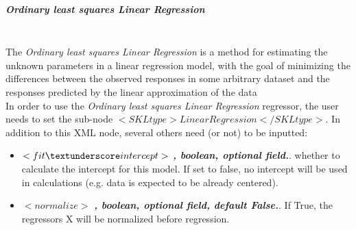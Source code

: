 \subparagraph{Ordinary least squares Linear Regression}
\mbox{}
\\The \textit{Ordinary least squares Linear Regression} is a method for estimating the unknown parameters in a linear regression model, with the goal of minimizing the differences between the observed responses in some arbitrary dataset and the responses predicted by the linear approximation of the data
\\In order to use the \textit{Ordinary least squares Linear Regression} regressor, the user needs to set the sub-node $<SKLtype>LinearRegression</SKLtype>$.
In addition to this XML node, several others need (or not) to be inputted:
\begin{itemize}
  \item $<fit \textunderscore intercept>$ \textbf{\textit{, boolean, optional field.}}. whether to calculate the intercept for this model. If set to false, no intercept will be used in calculations (e.g. data is expected to be already centered).
  \item $<normalize>$ \textbf{\textit{, boolean, optional field, default False.}}. If True, the regressors X will be normalized before regression.
\end{itemize}

